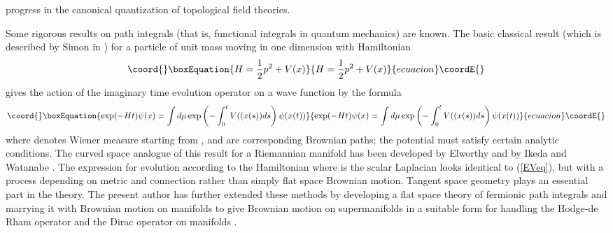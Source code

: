 \documentclass[a4paper,fleqn,12pt]{article}
\providecommand{\half}{\frac12}
\begin{document}
progress in the canonical quantization of topological field
theories.
 \par
Some rigorous results on path integrals (that is, functional
integrals in quantum mechanics) are known. The basic classical
result (which is described by Simon in \cite{Simon}) for a
particle of unit mass moving in one dimension with Hamiltonian
 \begin{equation}\coord{}\boxEquation{
  H = \half p^2 + V(x)
 }{
  H = \half p^2 + V(x)
 }{ecuacion}\coordE{}\end{equation}
gives the action of the imaginary time  evolution
operator \coordHE{} on a wave function \coordHE{} by the formula
 \begin{equation}\coord{}\boxEquation{\label{EVeq}
   \exp (-Ht) \psi(x)
  = \int d\mu \exp \left( -\int_0^t V((x(s)) ds \right) \psi(x(t))
 }{\exp (-Ht) \psi(x)
  = \int d\mu \exp \left( -\int_0^t V((x(s)) ds \right) \psi(x(t))
 }{ecuacion}\coordE{}\end{equation}
where \coordHE{} denotes Wiener measure starting from \coordHE{}, and \coordHE{}
are corresponding Brownian paths; the potential \coordHE{} must satisfy
certain analytic conditions. The curved space analogue of this
result for a Riemannian manifold has been developed by Elworthy
\cite{Elwort} and by Ikeda and Watanabe \cite{IkeWat}. The
expression for evolution according to the Hamiltonian \coordHE{}
where \coordHE{} is the scalar Laplacian looks identical to (\ref{EVeq}),
but with \coordHE{} a process depending on metric and connection
rather than simply flat space Brownian motion. Tangent space
geometry plays an essential part in the theory. The present author
has further extended these methods  by developing a flat space
theory of fermionic path integrals \cite{GBM} and marrying it with
Brownian motion on manifolds to give Brownian motion on
supermanifolds in a suitable form for handling  the Hodge-de Rham
operator and the Dirac operator on manifolds \cite{SCSTWO,JMPFI}.
%
\end{document}
